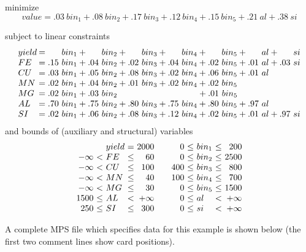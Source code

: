 \medskip
\noindent minimize
$$
value = .03\ bin_1 + .08\ bin_2 + .17\ bin_3 + .12\ bin_4 + .15\ bin_5
+ .21\ al + .38\ si
$$

\noindent subject to linear constraints
$$
\begin{array}{@{}l@{\:}l@{}}
yield &= \ \ \ \ \;bin_1 + \ \ \ \ \;bin_2 + \ \ \ \ \;bin_3 +
         \ \ \ \ \;bin_4 + \ \ \ \ \;bin_5 + \ \ \ \ \;al +
         \ \ \ \ \;si \\
FE    &= .15\ bin_1 + .04\ bin_2 + .02\ bin_3 + .04\ bin_4 + .02\ bin_5
         + .01\ al + .03\ si \\
CU    &= .03\ bin_1 + .05\ bin_2 + .08\ bin_3 + .02\ bin_4 + .06\ bin_5
         + .01\ al \\
MN    &= .02\ bin_1 + .04\ bin_2 + .01\ bin_3 + .02\ bin_4 + .02\ bin_5
         \\
MG    &= .02\ bin_1 + .03\ bin_2
\ \ \ \ \ \ \ \ \ \ \ \ \ \ \ \ \ \ \ \ \ \ \ \ \ \ \ \ + .01\ bin_5 \\
AL    &= .70\ bin_1 + .75\ bin_2 + .80\ bin_3 + .75\ bin_4 + .80\ bin_5
         + .97\ al \\
SI    &= .02\ bin_1 + .06\ bin_2 + .08\ bin_3 + .12\ bin_4 + .02\ bin_5
         + .01\ al + .97\ si \\
\end{array}
$$
and bounds of (auxiliary and structural) variables
$$
\begin{array}{r@{\ }l@{\ }l@{\ }l@{\ }rcr@{\ }l@{\ }l@{\ }l@{\ }r}
&&yield&=&2000&&0&\leq&bin_1&\leq&200\\
-\infty&<&FE&\leq&60&&0&\leq&bin_2&\leq&2500\\
-\infty&<&CU&\leq&100&&400&\leq&bin_3&\leq&800\\
-\infty&<&MN&\leq&40&&100&\leq&bin_4&\leq&700\\
-\infty&<&MG&\leq&30&&0&\leq&bin_5&\leq&1500\\
1500&\leq&AL&<&+\infty&&0&\leq&al&<&+\infty\\
250&\leq&SI&\leq&300&&0&\leq&si&<&+\infty\\
\end{array}
$$

A complete MPS file which specifies data for this example is shown
below (the first two comment lines show card positions).

